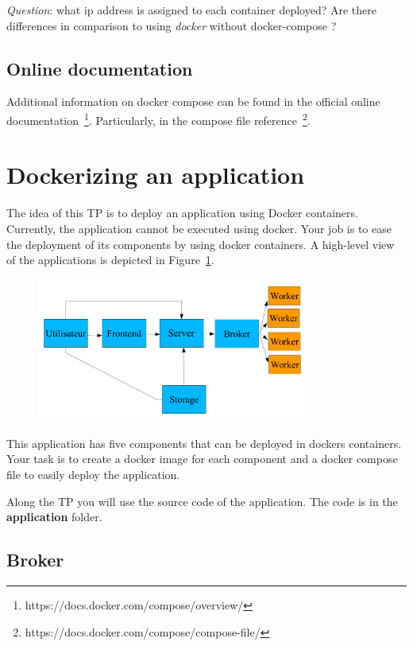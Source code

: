 \documentclass[a4paper,11pt]{exam}
\begin{document}
\textit{Question}: what ip address is assigned to each container deployed? Are there differences in comparison to using \textit{docker} without docker-compose ?

\subsection{Online documentation}
Additional information on docker compose can be found in the official online documentation~\footnote{https://docs.docker.com/compose/overview/}. Particularly,  in the compose file reference~\footnote{https://docs.docker.com/compose/compose-file/}.

\section{Dockerizing an application}

The idea of this TP is to deploy an application using Docker containers.
Currently, the application cannot be executed using docker. Your job is to ease the deployment of its components by using docker containers.
A high-level view of the applications is depicted in Figure~\ref{fig:architecture}.

\begin{figure}[!ht]
	\centering
	\includegraphics[width=0.8\textwidth]{fig/architecture.png}
	\label{fig:architecture}
\end{figure}

This application has five components that can be deployed in dockers containers.
Your task is to create a docker image for each component and a docker compose file to easily deploy the application.

Along the TP you will use the source code of the application. The code is in the \textbf{application} folder.

\subsection{Broker}
\end{document}

